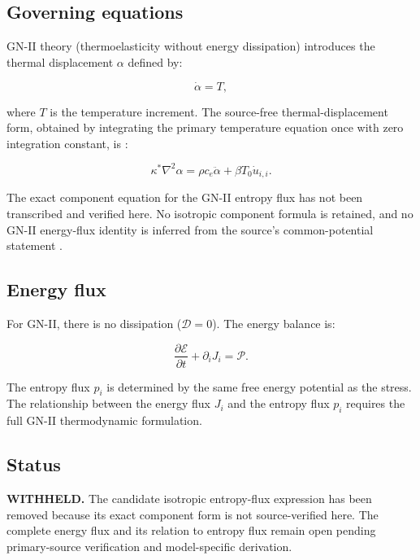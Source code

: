 \subsection{Governing equations}

GN-II theory (thermoelasticity without energy dissipation) introduces the thermal displacement $\alpha$ defined by:

\begin{equation}
\dot{\alpha} = T,
\label{ef:gn2:1}
\end{equation}

where $T$ is the temperature increment. The source-free thermal-displacement form, obtained by integrating the primary temperature equation once with zero integration constant, is \cite{Green1993}:

\begin{equation}
\kappa^*\nabla^2\alpha = \rho c_e \ddot{\alpha} + \beta T_0 \dot{u}_{i,i}.
\label{ef:gn2:2}
\end{equation}

The exact component equation for the GN-II entropy flux has not been transcribed and verified here. No isotropic component formula is retained, and no GN-II energy-flux identity is inferred from the source's common-potential statement \cite{Green1993}.

\subsection{Energy flux}

For GN-II, there is no dissipation ($\mathcal{D} = 0$). The energy balance is:

\begin{equation}
\frac{\partial\mathcal{E}}{\partial t} + \partial_i J_i = \mathcal{P}.
\label{ef:gn2:4}
\end{equation}

The entropy flux $p_i$ is determined by the same free energy potential as the stress. The relationship between the energy flux $J_i$ and the entropy flux $p_i$ requires the full GN-II thermodynamic formulation.

\subsection{Status}

\textbf{WITHHELD.} The candidate isotropic entropy-flux expression has been removed because its exact component form is not source-verified here. The complete energy flux and its relation to entropy flux remain open pending primary-source verification and model-specific derivation.

